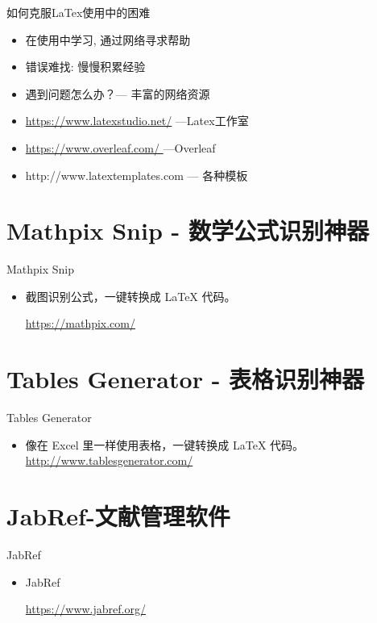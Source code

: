 \documentclass[13pt]{ctexbeamer}
\begin{document}
\begin{frame}{如何克服LaTex使用中的困难}
	\begin{itemize}
\item 	  在使用中学习, 通过网络寻求帮助

\item 	  错误难找: 慢慢积累经验

\item 	  遇到问题怎么办？---  丰富的网络资源

	\end{itemize}

	
\begin{itemize}
    \item 
    \href{https://www.latexstudio.net/}{https://www.latexstudio.net/}    ---Latex工作室  
    \item 
    \href{https://www.overleaf.com/
}{https://www.overleaf.com/
}   ---Overleaf  
\item 
http://www.latextemplates.com --- 各种模板

\end{itemize}
  
    
    
\end{frame}

\section{Mathpix Snip - 数学公式识别神器}
\begin{frame}{Mathpix Snip}
\begin{itemize}
	\item 截图识别公式，一键转换成 LaTeX 代码。
	
\href{https://mathpix.com/}{https://mathpix.com/}
\end{itemize}
\end{frame} 


\section{Tables Generator - 表格识别神器 }
\begin{frame}{Tables Generator }
\begin{itemize}
	\item 	 像在 Excel 里一样使用表格，一键转换成 LaTeX 代码。 
	\href{ http://www.tablesgenerator.com/}{ http://www.tablesgenerator.com/}

\end{itemize}


\end{frame}


\section{JabRef-文献管理软件}
\begin{frame}{JabRef}
\begin{itemize}
\item  JabRef

\href{https://www.jabref.org/}{https://www.jabref.org/}
\end{itemize}
\end{frame} 
\end{document}
